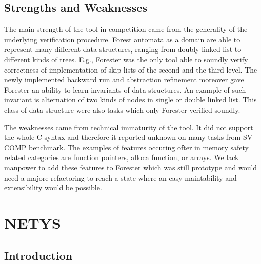{\section{Strengths and Weaknesses}

The main strength of the tool in competition came from the generality of the underlying
verification procedure.
Forest automata as a domain are able to represent many different data structures,
ranging from doubly linked list to different kinds of trees.
E.g., Forester was the only tool able to soundly verify correctness of implementation of skip lists
of the second and the third level.
The newly implemented backward run and abstraction refinement moreover gave Forester
an ability to learn invariants of data structures.
An example of such invariant is alternation of two kinds of nodes in single or double linked list.
This class of data structure were also tasks which only Forester verified soundly.

The weaknesses came from technical immaturity of the tool.
It did not support the whole C syntax and therefore it reported
unknown on many tasks from SV-COMP benchmark.
The examples of features occuring ofter in memory safety related categories are function  
pointers, alloca function, or arrays.
We lack manpower to add these features to Forester which was still prototype and
would need a majore refactoring to reach a state where an easy maintability and extensibility would be possible.

\chapter{NETYS}
\label{ch:netys}
\section{Introduction}

}
